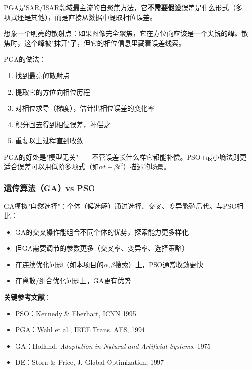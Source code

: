 \documentclass[12pt, a4paper]{article}
\begin{document}
PGA是SAR/ISAR领域最主流的自聚焦方法，它\textbf{不需要假设}误差是什么形式（多项式还是其他），而是直接从数据中提取相位误差。

\begin{intubox}[PGA的直觉理解]
想象一个明亮的散射点：如果图像完全聚焦，它在方位向应该是一个尖锐的峰。散焦时，这个峰被"抹开"了，但它的相位信息里藏着误差线索。

PGA的做法：
\begin{enumerate}
  \item 找到最亮的散射点
  \item 提取它的方位向相位历程
  \item 对相位求导（梯度），估计出相位误差的变化率
  \item 积分回去得到相位误差，补偿之
  \item 重复以上过程直到收敛
\end{enumerate}
PGA的好处是"模型无关"——不管误差长什么样它都能补偿。PSO+最小熵法则更适合误差可以用低阶多项式（如$\alpha t + \beta t^2$）描述的场景。
\end{intubox}

\subsubsection{遗传算法（GA）vs PSO}

GA模拟"自然选择"：个体（候选解）通过选择、交叉、变异繁殖后代。与PSO相比：
\begin{itemize}
  \item GA的交叉操作能组合不同个体的优势，探索能力更多样化
  \item 但GA需要调节的参数更多（交叉率、变异率、选择策略）
  \item 在连续优化问题（如本项目的$\alpha, \beta$搜索）上，PSO通常收敛更快
  \item 在离散/组合优化问题上，GA更有优势
\end{itemize}

\textbf{关键参考文献}：
\begin{itemize}
  \item PSO：Kennedy \& Eberhart, ICNN 1995
  \item PGA：Wahl et al., IEEE Trans. AES, 1994
  \item GA：Holland, \textit{Adaptation in Natural and Artificial Systems}, 1975
  \item DE：Storn \& Price, J. Global Optimization, 1997
\end{itemize}

\end{document}
